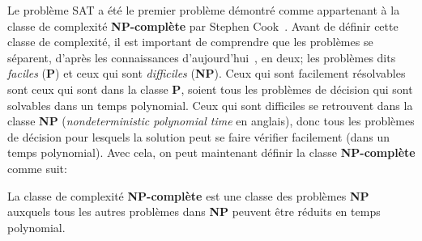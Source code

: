 Le problème SAT a été le premier problème démontré comme appartenant à la classe de complexité \textbf{NP-complète} par Stephen Cook~\cite{cook1971}.
Avant de définir cette classe de complexité, il est important de comprendre que les problèmes se séparent, d'après les connaissances d'aujourd'hui~\cite{millenniumPrizeProblems}, en deux; les problèmes dits \emph{faciles} (\textbf{P}) et ceux qui sont \emph{difficiles} (\textbf{NP}).
Ceux qui sont facilement résolvables sont ceux qui sont dans la classe \textbf{P}, soient tous les problèmes de décision qui sont solvables dans un temps polynomial.
Ceux qui sont difficiles se retrouvent dans la classe \textbf{NP} (\textit{nondeterministic polynomial time} en anglais), donc tous les problèmes de décision pour lesquels la solution peut se faire vérifier facilement (dans un temps polynomial).
Avec cela, on peut maintenant définir la classe \textbf{NP-complète} comme suit:
\begin{definition}\label{def:NP-complete}
    La classe de complexité \textbf{NP-complète} est une classe des problèmes \textbf{NP} auxquels tous les autres problèmes dans \textbf{NP} peuvent être réduits en temps polynomial.
\end{definition}
